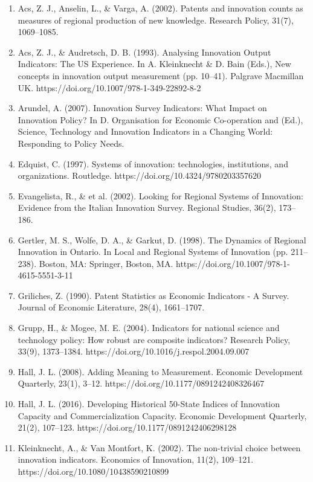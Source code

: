 \documentclass[a4paper,11pt]{article}
\begin{document}
\begin{enumerate}
\item Acs, Z. J., Anselin, L., \& Varga, A. (2002). Patents and innovation counts as measures of regional production of new knowledge. Research Policy, 31(7), 1069–1085.
\item Acs, Z. J., \& Audretsch, D. B. (1993). Analysing Innovation Output Indicators: The US Experience. In A. Kleinknecht \& D. Bain (Eds.), New concepts in innovation output measurement (pp. 10–41). Palgrave Macmillan UK. https://doi.org/10.1007/978-1-349-22892-8-2
\item Arundel, A. (2007). Innovation Survey Indicators: What Impact on Innovation Policy? In D. Organisation for Economic Co-operation and (Ed.), Science, Technology and Innovation Indicators in a Changing World: Responding to Policy Needs.
\item Edquist, C. (1997). Systems of innovation: technologies, institutions, and organizations. Routledge. https://doi.org/10.4324/9780203357620
\item Evangelista, R., \& et al. (2002). Looking for Regional Systems of Innovation: Evidence from the Italian Innovation Survey. Regional Studies, 36(2), 173–186.
\item Gertler, M. S., Wolfe, D. A., \& Garkut, D. (1998). The Dynamics of Regional Innovation in Ontario. In Local and Regional Systems of Innovation (pp. 211–238). Boston, MA: Springer, Boston, MA. https://doi.org/10.1007/978-1-4615-5551-3-11
\item Griliches, Z. (1990). Patent Statistics as Economic Indicators - A Survey. Journal of Economic Literature, 28(4), 1661–1707.
\item Grupp, H., \& Mogee, M. E. (2004). Indicators for national science and technology policy: How robust are composite indicators? Research Policy, 33(9), 1373–1384. https://doi.org/10.1016/j.respol.2004.09.007
\item Hall, J. L. (2008). Adding Meaning to Measurement. Economic Development Quarterly, 23(1), 3–12. https://doi.org/10.1177/0891242408326467
\item Hall, J. L. (2016). Developing Historical 50-State Indices of Innovation Capacity and Commercialization Capacity. Economic Development Quarterly, 21(2), 107–123. https://doi.org/10.1177/0891242406298128
\item Kleinknecht, A., \& Van Montfort, K. (2002). The non-trivial choice between innovation indicators. Economics of Innovation, 11(2), 109–121. https://doi.org/10.1080/10438590210899

\end{enumerate}
\end{document}
